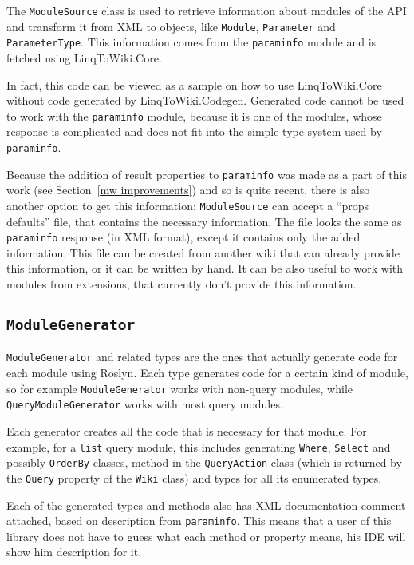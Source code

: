 The \lstinline{ModuleSource} class is used to retrieve information about modules of the API
and transform it from XML to objects, like \lstinline{Module}, \lstinline{Parameter} and \lstinline{Parameter}\lstBreak\lstinline{Type}.
This information comes from the \texttt{paraminfo} module and is fetched using LinqToWiki.Core.

In fact, this code can be viewed as a sample on how to use LinqToWiki.Core
without code generated by LinqToWiki.Codegen.
Generated code cannot be used to work with the \texttt{paraminfo} module,
because it is one of the modules, whose response is complicated
and does not fit into the simple type system used by \texttt{paraminfo}.

Because the addition of result properties to \texttt{paraminfo} was made as a part of this work
(see Section~\ref{mw improvements}) and so is quite recent, there is also another option to get this information:
\lstinline{ModuleSource} can accept a “props defaults” file, that contains the necessary information.
The file looks the same as \texttt{paraminfo} response (in XML format),
except it contains only the added information.
This file can be created from another wiki that can already provide this information,
or it can be written by hand.
It can be also useful to work with modules from extensions, that currently don't provide this information.

\subsection{\texorpdfstring{\lstinline{ModuleGenerator}}{ModuleGenerator}}

\lstinline{ModuleGenerator} and related types are the ones that actually generate code for each module using Roslyn.
Each type generates code for a certain kind of module,
so for example \lstinline{ModuleGenerator} works with non-query modules,
while \lstinline{QueryModuleGenerator} works with most query modules.

Each generator creates all the code that is necessary for that module.
For example, for a \texttt{list} query module,
this includes generating \lstinline{Where}, \lstinline{Select} and possibly \lstinline{OrderBy} classes,
method in the \lstinline{QueryAction} class
(which is returned by the \lstinline{Query} property of the \lstinline{Wiki} class)
and types for all its enumerated types.

Each of the generated types and methods also has XML documentation comment attached,
based on description from \texttt{paraminfo}.
This means that a user of this library does not have to guess what each method or property means,
his IDE will show him description for it.

